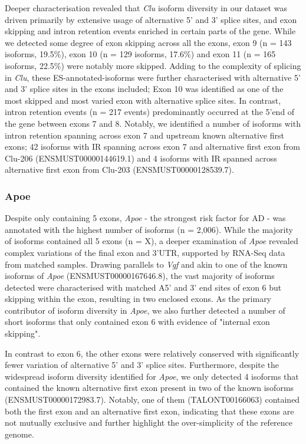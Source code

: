 Deeper characterisation revealed that \textit{Clu} isoform diversity in our dataset was driven primarily by extensive usage of alternative 5' and 3' splice sites, and exon skipping and intron retention events enriched in certain parts of the gene. While we detected some degree of exon skipping across all the exons, exon 9 (n = 143 isoforms, 19.5\%), exon 10 (n = 129 isoforms, 17.6\%) and exon 11 (n = 165 isoforms, 22.5\%) were notably more skipped. Adding to the complexity of splicing in \textit{Clu}, these ES-annotated-isoforms were further characterised with alternative 5' and 3' splice sites in the exons included; Exon 10 was identified as one of the most skipped and most varied exon with alternative splice sites. In contrast, intron retention events (n = 217 events) predominantly occurred at the 5'end of the gene between exons 7 and 8. Notably, we identified a number of isoforms with intron retention spanning across exon 7 and upstream known alternative first exons; 42 isoforms with IR spanning across exon 7 and alternative first exon from Clu-206 (ENSMUST00000144619.1) and 4 isoforms with IR spanned across alternative first exon from Clu-203 (ENSMUST00000128539.7). 

\subsubsection{Apoe}
Despite only containing 5 exons, \textit{Apoe} - the strongest risk factor for AD - was annotated with the highest number of isoforms (n = 2,006). While the majority of isoforms contained all 5 exons (n = X), a deeper examination of \textit{Apoe} revealed complex variations of the final exon and 3'UTR, 
supported by RNA-Seq data from matched samples. Drawing parallels to \textit{Vgf} and akin to one of the known isoforms of \textit{Apoe} (ENSMUST00000167646.8), the vast majority of isoforms detected were characterised with matched A5' and 3' end sites of exon 6 but skipping within the exon, resulting in two enclosed exons. As the primary contributor of isoform diversity in \textit{Apoe}, we also further detected a number of short isoforms that only contained exon 6 with evidence of "internal exon skipping". 

In contrast to exon 6, the other exons were relatively conserved with significantly fewer variation of alternative 5' and 3' splice sites. Furthermore, despite the widespread isoform diversity identified for \textit{Apoe}, we only detected 4 isoforms that contained the known alternative first exon present in two of the known isoforms (ENSMUST00000172983.7). Notably, one of them (TALONT00166063) contained both the first exon and an alternative first exon, indicating that these exons are not mutually exclusive and further highlight the over-simplicity of the reference genome. 

